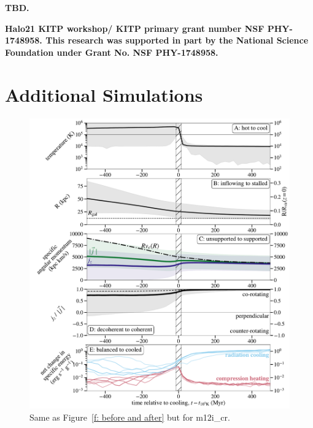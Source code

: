 \documentclass[fleqn,usenatbib]{mnras}
\begin{document}
\textbf{TBD.}

\textbf{Halo21 KITP workshop/ KITP primary grant number NSF PHY-1748958.
This research was supported in part by the National Science Foundation under Grant No. NSF PHY-1748958.
}










\appendix

\section{Additional Simulations}

\begin{figure}
\includegraphics[width=\textwidth]{figures/before_vs_after_cr.pdf}
\caption{
Same as Figure~\ref{f: before and after} but for m12i\_cr.
}
\label{f: before and after cr}
\end{figure}
\end{document}
